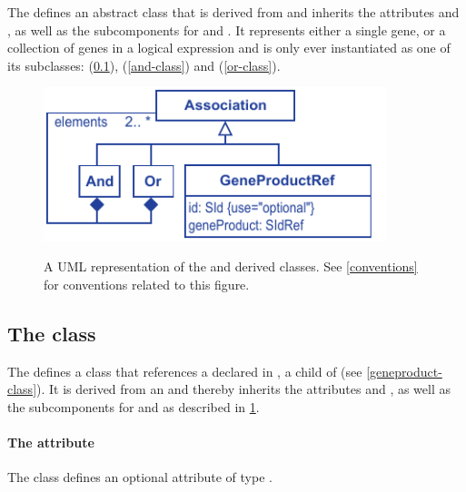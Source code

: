 The \FBCPackage defines an abstract \Association class that is
derived from \SBase and inherits the attributes  and
, as well as the subcomponents for \Annotation and \Notes.
It represents either a single gene, or a collection of genes in a
logical expression and is only ever instantiated as one of its
subclasses: \GeneProductRef (\ref{geneproductref-class}), \GeneAnd
(\ref{and-class}) and \GeneOr (\ref{or-class}).
%
\begin{figure}[ht!]
  \centering
  \includegraphics[width=10cm]{images/v2harmony_fbc_association.pdf}\\
  \caption{A UML representation of the \FBCPackage \Association and derived
	classes. See \ref{conventions} for conventions related to this figure.}
  \label{fig:fbc_uml_ass}
\end{figure}

\subsection{The \FBC {} class}
\label{geneproductref-class}

The \FBCPackage defines a \GeneProductRef class that references
a \GeneProduct declared in \ListOfGeneProducts, a child of
\Model (see \ref{geneproduct-class}). It is derived from an \Association and thereby inherits the \SBase attributes  and , as well as the subcomponents for \Annotation and \Notes as described in \ref{fig:fbc_uml_ass}.

\paragraph{The  attribute}
The \GeneProductRef class defines an optional attribute  of type .


